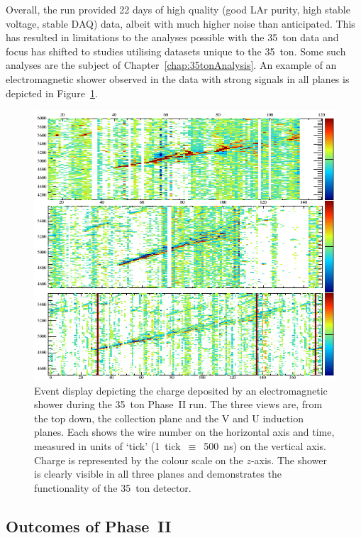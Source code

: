 Overall, the run provided 22 days of high quality (good LAr purity, high stable voltage, stable DAQ) data, albeit with much higher noise than anticipated.  This has resulted in limitations to the analyses possible with the 35~ton data and focus has shifted to studies utilising datasets unique to the 35~ton.  Some such analyses are the subject of Chapter~\ref{chap:35tonAnalysis}.  An example of an electromagnetic shower observed in the data with strong signals in all planes is depicted in Figure~\ref{fig:FamousShower}.

\begin{figure}
  \centering
  \includegraphics[width=12cm]{FamousShower.png}
  \caption[Event display depicting the charge deposited by an electromagnetic shower during the 35~ton Phase~II run.]{Event display depicting the charge deposited by an electromagnetic shower during the 35~ton Phase~II run.  The three views are, from the top down, the collection plane and the V and U induction planes.  Each shows the wire number on the horizontal axis and time, measured in units of `tick' (1~tick~$\equiv$~500~ns) on the vertical axis.  Charge is represented by the colour scale on the $z$-axis.  The shower is clearly visible in all three planes and demonstrates the functionality of the 35~ton detector.}
  \label{fig:FamousShower}
\end{figure}

\subsection{Outcomes of Phase~II}\label{sec:35tonPhaseIIOutcomes}


